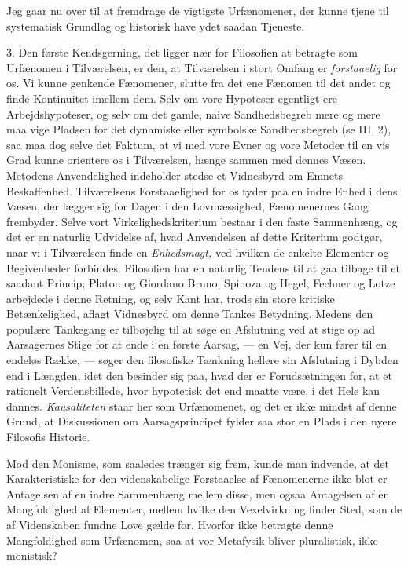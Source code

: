 \documentclass[12pt,a4paper,openany]{book}
\newcommand{\opage}[1]{\marginnote{\footnotesize\textit{[#1]}}}
\begin{document}
Jeg gaar nu over til at fremdrage de vigtigste Urfænomener, der kunne tjene til
systematisk Grundlag og historisk have ydet saadan Tjeneste.

3. Den første Kendsgerning, det ligger nær for Filosofien at betragte som
Urfænomen i Tilværelsen, er den, at Tilværelsen i stort Omfang er
\textit{forstaaelig} for os. Vi kunne genkende Fænomener, slutte fra det ene
Fænomen til det andet og finde Kontinuitet imellem dem. Selv om vore Hypoteser
egentligt ere Arbejdshypoteser, og selv om det gamle, naive Sandhedsbegreb mere
og mere maa vige Pladsen for det dynamiske eller symbolske Sandhedsbegreb (se
III, 2), saa maa dog selve det Faktum, at vi med vore Evner og vore Metoder til
en vis Grad kunne orientere os i Tilværelsen, hænge sammen med dennes Væsen.
Metodens Anvendelighed indeholder stedse et Vidnesbyrd om Emnets Beskaffenhed.
Tilværelsens Forstaaelighed for os tyder paa en indre Enhed i dens Væsen, der
lægger sig for Dagen i den Lovmæssighed, Fænomenernes Gang frembyder. Selve
vort Virkelighedskriterium bestaar i den faste Sammenhæng, og det
\opage{60}er en naturlig Udvidelse af, hvad Anvendelsen af dette Kriterium
godtgør, naar vi i Tilværelsen finde en \textit{Enhedsmagt,} ved hvilken de
enkelte Elementer og Begivenheder forbindes. Filosofien har en naturlig Tendens
til at gaa tilbage til et saadant Princip; Platon og Giordano Bruno, Spinoza og
Hegel, Fechner og Lotze arbejdede i denne Retning, og selv Kant har, trods sin
store kritiske Betænkelighed, aflagt Vidnesbyrd om denne Tankes Betydning.
Medens den populære Tankegang er tilbøjelig til at søge en Afslutning ved at
stige op ad Aarsagernes Stige for at ende i en første Aarsag, --- en Vej, der
kun fører til en endeløs Række, --- søger den filosofiske Tænkning hellere sin
Afslutning i Dybden end i Længden, idet den besinder sig paa, hvad der er
Forudsætningen for, at et rationelt Verdensbillede, hvor hypotetisk det end
maatte være, i det Hele kan dannes. \textit{Kausaliteten} staar her som
Urfænomenet, og det er ikke mindst af denne Grund, at Diskussionen om
Aarsagsprincipet fylder saa stor en Plads i den nyere Filosofis Historie.

Mod den Monisme, som saaledes trænger sig frem, kunde man indvende, at det
Karakteristiske for den videnskabelige Forstaaelse af Fænomenerne ikke blot er
Antagelsen af en indre Sammenhæng mellem disse, men ogsaa Antagelsen af en
Mangfoldighed af Elementer, mellem hvilke den Vexelvirkning finder Sted, som de
af Videnskaben fundne Love gælde for. Hvorfor ikke betragte denne Mangfoldighed
som Urfænomen, saa at vor Metafysik bliver pluralistisk, ikke monistisk?
\end{document}

